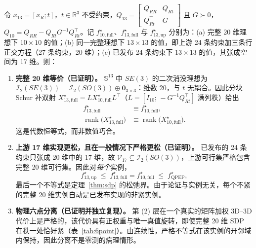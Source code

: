 \begin{theorem}\label{thm:thirteen}
令 $x_{13}=[x_R;t]$，$t\in\mathbb{R}^3$ 不受约束，$Q_{13}=\begin{bmatrix}Q_{RR}&Q_{Rt}\\Q_{Rt}^\top&G\end{bmatrix}$ 且 $G\succ0$，$Q_{10}=Q_{RR}-Q_{Rt}G^{-1}Q_{Rt}^\top$。记 $f^\star_{10,\mathrm{full}}$、$f^\star_{13,\mathrm{full}}$ 与 $f^\star_{13,\mathrm{up}}$ 分别为：(a) 完整 20 维理想下 $10\times10$ 的值；(b) 同一完整理想下 $13\times13$ 的值，即上游 24 条约束加三条行正交方程（27 条约束，20 维）；(c) 已发布 24 条约束下 $13\times13$ 的值，其张成空间为 17 维。则：
\begin{enumerate}
\item \textbf{完整 20 维等价（已证明）。} $\mathbb{S}^{13}$ 中 $SE(3)$ 的二次消没理想为 $\mathcal{I}_2(SE(3))=\mathcal{I}_2(SO(3))\oplus\mathbf{0}_{3\times3}$：维数 20，与 $t$ 无耦合。因此分块 Schur 补双射 $X^\star_{13,\mathrm{full}}=LX^\star_{10,\mathrm{full}}L^\top$（$L=[I_{10};\,-G^{-1}Q_{Rt}^\top]$ 满列秩）给出
\begin{equation}
\begin{split}
f^\star_{13,\mathrm{full}}&\equiv f^\star_{10,\mathrm{full}},\\
\operatorname{rank}\big(X^\star_{13,\mathrm{full}}\big)&\equiv\operatorname{rank}\big(X^\star_{10,\mathrm{full}}\big).
\end{split}
\label{eq:schur}
\end{equation}
这是代数恒等式，而非数值巧合。
\item \textbf{上游 17 维实现更松，且在一般情况下严格更松（已证明）。} 已发布的 24 条约束只张成 20 维中的 17 维，故 $\mathcal{V}_{17}\subsetneq\mathcal{I}_2(SO(3))$，上游可行集严格包含完整 20 维可行集。因此对\emph{每个}实例，
\begin{equation}
f^\star_{13,\mathrm{up}}\;\le\;f^\star_{13,\mathrm{full}}=f^\star_{10,\mathrm{full}}\;\le\;f^\star_{\mathrm{QPEP}},
\label{eq:hierarchy}
\end{equation}
最后一个不等式是定理~\ref{thm:sdp} 的松弛界。由于论证与实例无关，每个不紧的完整 20 维实例自动是已发布实现的非紧实例。
\item \textbf{物理六点分离（已证明并独立复现）。} 第 (2) 层在一个真实的矩阵加权 3D--3D 代价上是严格的，该代价具有正权重与唯一真值旋转，即使完整 20 维 SDP 在秩一处恰好紧（表~\ref{tab:6point}）。由连续性，严格不等式在该实例的开邻域内保持，因此分离不是零测的病理情形。
\end{enumerate}
\end{theorem}


